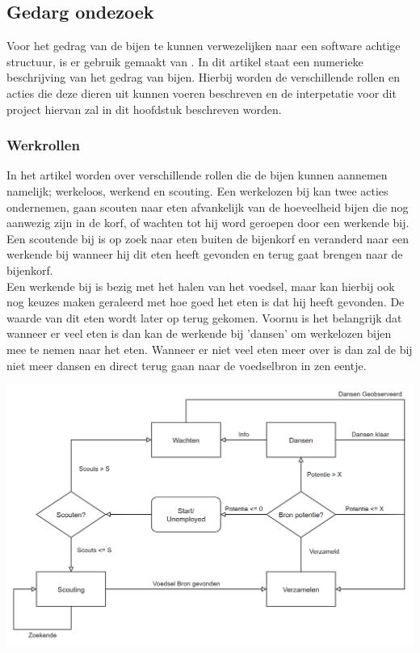 \subsection{Gedarg ondezoek}
Voor het gedrag van de bijen te kunnen verwezelijken naar een software achtige structuur, is er gebruik gemaakt van
\cite{akbari_mohammadi_ziarati_2010}. In dit artikel staat een numerieke beschrijving van het gedrag van bijen.
Hierbij worden de verschillende rollen en acties die deze dieren uit kunnen voeren beschreven
en de interpetatie voor dit project hiervan zal in dit hoofdstuk beschreven worden.

\subsubsection{Werkrollen}
In het artikel worden over verschillende rollen die de bijen kunnen aannemen namelijk; werkeloos, werkend en scouting.
Een werkelozen bij kan twee acties ondernemen, gaan scouten naar eten afvankelijk van de hoeveelheid bijen die nog aanwezig zijn in de korf,
of wachten tot hij word geroepen door een werkende bij. Een scoutende bij is op zoek naar eten buiten de bijenkorf en veranderd naar een werkende bij
wanneer hij dit eten heeft gevonden en terug gaat brengen naar de bijenkorf.\\

Een werkende bij is bezig met het halen van het voedsel, maar kan hierbij ook nog keuzes maken geraleerd met hoe goed het eten is dat hij heeft gevonden.
De waarde van dit eten wordt later op terug gekomen. Voornu is het belangrijk dat wanneer er veel eten is dan kan de werkende bij 'dansen'
om werkelozen bijen mee te nemen naar het eten. Wanneer er niet veel eten meer over is dan zal de bij niet meer dansen en direct terug gaan naar de voedselbron 
in zen eentje.

\includegraphics[scale=0.33]{../IMAGES/BijengedragFlowchart.png}

